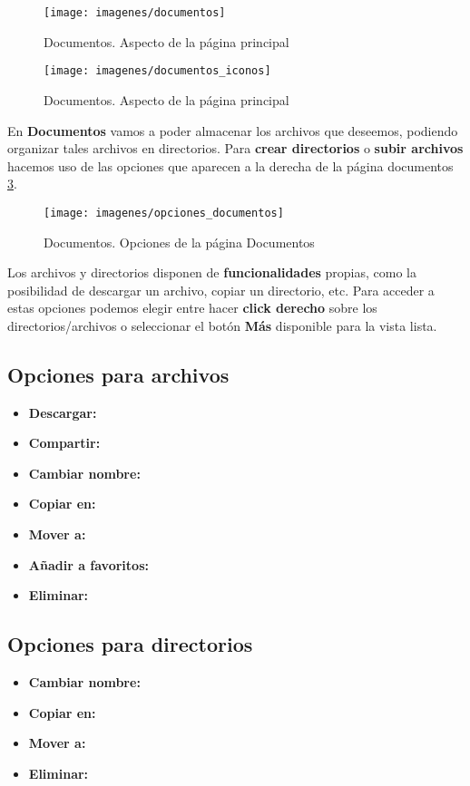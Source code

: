 \begin{figure}[H]
	\centering
	\texttt{[image: imagenes/documentos]}
	\caption{Documentos. Aspecto de la página principal}
	\label{fig:documentos}
\end{figure}

\begin{figure}[H]
	\centering
	\texttt{[image: imagenes/documentos\_iconos]}
	\caption{Documentos. Aspecto de la página principal}
	\label{fig:documentos_iconos}
\end{figure}

En \textbf{Documentos} vamos a poder almacenar los archivos que deseemos, podiendo organizar tales archivos en directorios. Para \textbf{crear directorios} o \textbf{subir archivos} hacemos uso de las opciones que aparecen a la derecha de la página documentos \ref{fig:opciones_documentos}.

\begin{figure}[H]
	\centering
	\texttt{[image: imagenes/opciones\_documentos]}
	\caption{Documentos. Opciones de la página Documentos}
	\label{fig:opciones_documentos}
\end{figure}

Los archivos y directorios disponen de \textbf{funcionalidades} propias, como la posibilidad de descargar un archivo, copiar un directorio, etc. Para acceder a estas opciones podemos elegir entre hacer \textbf{click derecho} sobre los directorios/archivos o seleccionar el botón \textbf{Más} disponible para la vista lista.

\subsection{Opciones para archivos}
\begin{itemize}
	\item \textbf{Descargar:}
	\item \textbf{Compartir:}
	\item \textbf{Cambiar nombre:}
	\item \textbf{Copiar en:}
	\item \textbf{Mover a:}
	\item \textbf{Añadir a favoritos:}
	\item \textbf{Eliminar:}
\end{itemize} 

\subsection{Opciones para directorios}
\begin{itemize}
	\item \textbf{Cambiar nombre:}
	\item \textbf{Copiar en:}
	\item \textbf{Mover a:}
	\item \textbf{Eliminar:}
\end{itemize} 